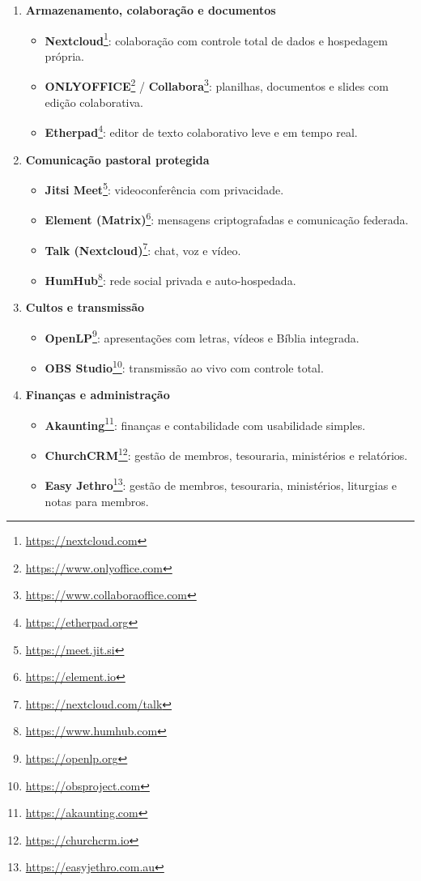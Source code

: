 \begin{enumerate}
    \item \textbf{Armazenamento, colaboração e documentos}
    \begin{itemize}
        \item \textbf{Nextcloud}\footnote{\url{https://nextcloud.com}}: colaboração com controle total de dados e hospedagem própria.
        \item \textbf{ONLYOFFICE}\footnote{\url{https://www.onlyoffice.com}} / \textbf{Collabora}\footnote{\url{https://www.collaboraoffice.com}}: planilhas, documentos e slides com edição colaborativa.
        \item \textbf{Etherpad}\footnote{\url{https://etherpad.org}}: editor de texto colaborativo leve e em tempo real.
    \end{itemize}

    \item \textbf{Comunicação pastoral protegida}
    \begin{itemize}
        \item \textbf{Jitsi Meet}\footnote{\url{https://meet.jit.si}}: videoconferência com privacidade.
        \item \textbf{Element (Matrix)}\footnote{\url{https://element.io}}: mensagens criptografadas e comunicação federada.
        \item \textbf{Talk (Nextcloud)}\footnote{\url{https://nextcloud.com/talk}}: chat, voz e vídeo.
        \item \textbf{HumHub}\footnote{\url{https://www.humhub.com}}: rede social privada e auto-hospedada.
    \end{itemize}

    \item \textbf{Cultos e transmissão}
    \begin{itemize}
        \item \textbf{OpenLP}\footnote{\url{https://openlp.org}}: apresentações com letras, vídeos e Bíblia integrada.
        \item \textbf{OBS Studio}\footnote{\url{https://obsproject.com}}: transmissão ao vivo com controle total.
    \end{itemize}

    \item \textbf{Finanças e administração}
    \begin{itemize}
        \item \textbf{Akaunting}\footnote{\url{https://akaunting.com}}: finanças e contabilidade com usabilidade simples.
        \item \textbf{ChurchCRM}\footnote{\url{https://churchcrm.io}}: gestão de membros, tesouraria, ministérios e relatórios.
        \item \textbf{Easy Jethro}\footnote{\url{https://easyjethro.com.au}}: gestão de membros, tesouraria, ministérios, liturgias e notas para membros.
    \end{itemize}


\end{enumerate}
